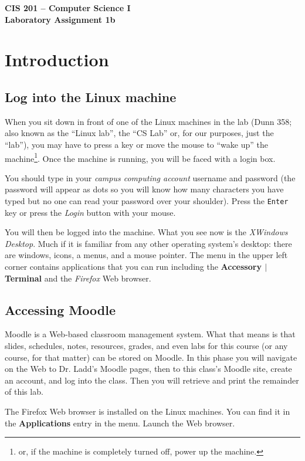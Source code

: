 \documentclass[12pt]{article}
\begin{document}
\begin{center}
\Large\bf
CIS 201 -- Computer Science I\\
Laboratory Assignment 1b\\
\end{center}

\section*{Introduction}
\subsection*{Log into the Linux machine}

When you sit down in front of one of the Linux machines in the lab
(Dunn 358; also known as the ``Linux lab'', the ``CS Lab'' or, for our
purposes, just the ``lab''), you may have to press a key or move the
mouse to ``wake up'' the machine\footnote{or, if the machine is completely
turned off, power up the machine.}. Once the machine is running, you
will be faced with a login box.

You should type in your \emph{campus computing account} username and
password (the password will appear as dots so you will know how many
characters you have typed but no one can read your password over your
shoulder). Press the \texttt{Enter} key or press the \emph{Login}
button with your mouse.

You will then be logged into the machine. What you see now is the
\emph{XWindows Desktop}. Much if it is familiar from any other
operating system's desktop: there are windows, icons, a menus, and a
mouse pointer. The menu in the upper
left corner contains applications that you can run including the
\textbf{Accessory $|$ Terminal} and the \emph{Firefox} Web browser.

\subsection*{Accessing Moodle}

Moodle is a Web-based classroom management system. What that means is
that slides, schedules, notes, resources, grades, and even labs for
this course (or any course, for that matter) can be stored on
Moodle. In this phase you will navigate on the Web to Dr. Ladd's
Moodle pages, then to this class's Moodle site, create an account, and
log into the class. Then you will retrieve and print the remainder of
this lab.

The Firefox Web browser is installed on the Linux machines. You can
find it in the \textbf{Applications} entry in the menu. Launch the Web
browser.
\end{document}
